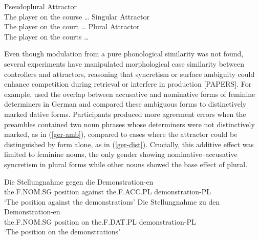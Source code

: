 \documentclass[
  authoryear,
  3p]{elsarticle}
\begin{document}
\begin{exe}
\ex \label{ex:bockeberhard93}
\begin{xlist}
    \ex \label{pseudo} {Pseudoplural Attractor} \\ The {player} on the {course} \ldots{}
    \ex \label{true-sg} {Singular Attractor} \\ The {player} on the {court} \ldots{}
    \ex \label{true-pl} {Plural Attractor} \\ The {player} on the {courts} \ldots{}
\end{xlist}
\end{exe}

Even though modulation from a pure phonological similarity was not
found, several experiments have manipulated morphological case
similarity between controllers and attractors, reasoning that syncretism
or surface ambiguity could enhance competition during retrieval or
interfere in production {[}PAPERS{]}. For example,
\citet{HartsuikerEtAl2003} used the overlap between accusative and
nominative forms of feminine determiners in German and compared these
ambiguous forms to distinctively marked dative forms. Participants
produced more agreement errors when the preambles contained two noun
phrases whose determiners were not distinctively marked, as in
(\ref{ger-amb}), compared to cases where the attractor could be
distinguished by form alone, as in (\ref{ger-dist}). Crucially, this
additive effect was limited to feminine nouns, the only gender showing
nominative--accusative syncretism in plural forms while other nouns
showed the base effect of plural.

\begin{exe}
\ex \label{ger}
\begin{xlist}
\ex \label{ger-amb}
\gll Die Stellungnahme gegen die Demonstration-en\\
the.F.NOM.SG position against the.F.ACC.PL demonstration-PL\\
\glt `The position against the demonstrations'
\ex \label{ger-dist}
\gll Die Stellungnahme zu den Demonstration-en\\
the.F.NOM.SG position on the.F.DAT.PL demonstration-PL\\
\glt `The position on the demonstrations'
\end{xlist}
\end{exe}
\end{document}
